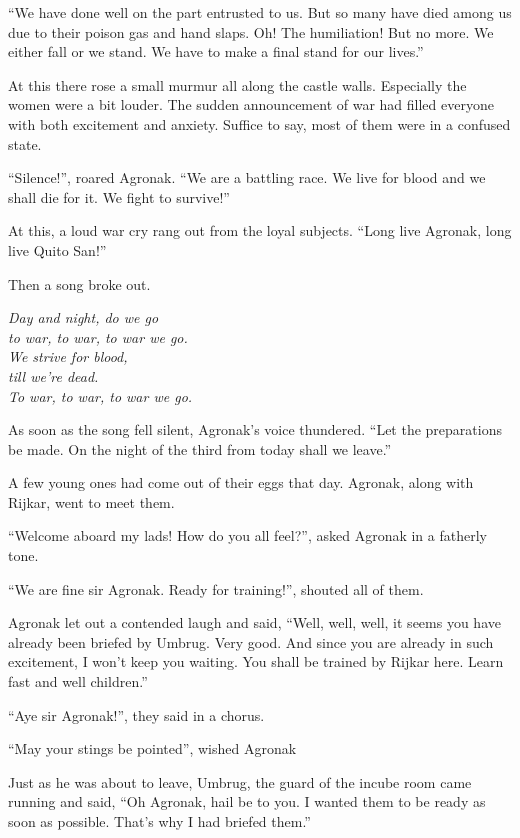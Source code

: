 \documentclass[twoside,11pt,titlepage]{article}
\begin{document}
``We have done well on the part entrusted to us. But so many have died among us due to their poison gas and hand slaps. Oh! The humiliation! But no more. We either fall or we stand. We have to make a final stand for our lives.''

At this there rose a small murmur all along the castle walls. Especially the women were a bit louder. The sudden announcement of war had filled everyone with both excitement and anxiety. Suffice to say, most of them were in a confused state.

``Silence!'', roared Agronak. ``We are a battling race. We live for blood and we shall die for it. We fight to survive!''

At this, a loud war cry rang out from the loyal subjects. ``Long live Agronak, long live Quito San!''

Then a song broke out.\\
\medskip
\begin{center}
\emph{Day and night, do we go \\ to war, to war, to war we go. \\We strive for blood, \\till we're dead. \\To war, to war, to war we go.}
\end{center}

As soon as the song fell silent, Agronak's voice thundered. ``Let the preparations be made. On the night of the third from today shall we leave.''

A few young ones had come out of their eggs that day. Agronak, along with Rijkar, went to meet them.

``Welcome aboard my lads! How do you all feel?'', asked Agronak in a fatherly tone.

``We are fine sir Agronak. Ready for training!'', shouted all of them.

Agronak let out a contended laugh and said, ``Well, well, well, it seems you have already been briefed by Umbrug. Very good. And since you are already in such excitement, I won't keep you waiting. You shall be trained by Rijkar here. Learn fast and well children.''

``Aye sir Agronak!'', they said in a chorus.

``May your stings be pointed'', wished Agronak

Just as he was about to leave, Umbrug, the guard of the incube room came running and said, ``Oh Agronak, hail be to you. I wanted them to be ready as soon as possible. That's why I had briefed them.''
\end{document}
